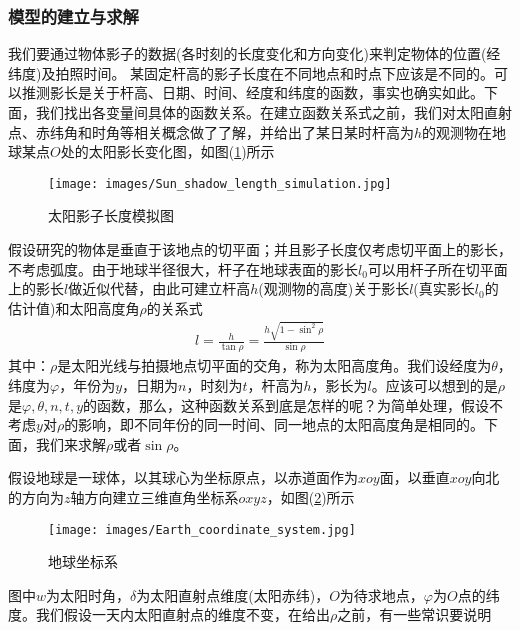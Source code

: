         \subsubsection{模型的建立与求解}
            \par
            我们要通过物体影子的数据(各时刻的长度变化和方向变化)来判定物体的位置(经纬度)及拍照时间。
            某固定杆高的影子长度在不同地点和时点下应该是不同的。可以推测影长是关于杆高、日期、时间、经度和纬度的函数，事实也确实如此。下面，我们找出各变量间具体的函数关系。在建立函数关系式之前，我们对太阳直射点、赤纬角和时角等相关概念做了了解，并给出了某日某时杆高为$h$的观测物在地球某点$O$处的太阳影长变化图，如图(\ref{fig:太阳影子长度模拟图})所示
			\begin{figure}[H]
			\centering
			\texttt{[image: images/Sun\_shadow\_length\_simulation.jpg]}
			\caption{太阳影子长度模拟图}
			\label{fig:太阳影子长度模拟图}
			\end{figure}
            \par
            假设研究的物体是垂直于该地点的切平面；并且影子长度仅考虑切平面上的影长，不考虑弧度。由于地球半径很大，杆子在地球表面的影长$l_0$可以用杆子所在切平面上的影长$l$做近似代替，由此可建立杆高$h$(观测物的高度)关于影长$l$(真实影长$l_0$的估计值)和太阳高度角$\rho$的关系式
            \begin{align*}
            l = \frac{h}{\tan\rho} = \frac{h\sqrt{1-\sin^2\rho}}{\sin\rho}
            \end{align*}
            其中：$\rho$是太阳光线与拍摄地点切平面的交角，称为太阳高度角。我们设经度为$\theta$，纬度为$\varphi$，年份为$y$，日期为$n$，时刻为$t$，杆高为$h$，影长为$l$。应该可以想到的是$\rho$是$\varphi,\theta,n,t,y$的函数，那么，这种函数关系到底是怎样的呢？为简单处理，假设不考虑$y$对$\rho$的影响，即不同年份的同一时间、同一地点的太阳高度角是相同的。下面，我们来求解$\rho$或者$\sin\rho$。
            \par
            假设地球是一球体，以其球心为坐标原点，以赤道面作为$xoy$面，以垂直$xoy$向北的方向为$z$轴方向建立三维直角坐标系$oxyz$，如图(\ref{fig:地球坐标系})所示
			\begin{figure}[H]
			\centering
			\texttt{[image: images/Earth\_coordinate\_system.jpg]}
			\caption{地球坐标系}
			\label{fig:地球坐标系}
			\end{figure}
            图中$w$为太阳时角，$\delta$为太阳直射点维度(太阳赤纬)，$O$为待求地点，$\varphi$为$O$点的纬度。我们假设一天内太阳直射点的维度不变，在给出$\rho$之前，有一些常识要说明
